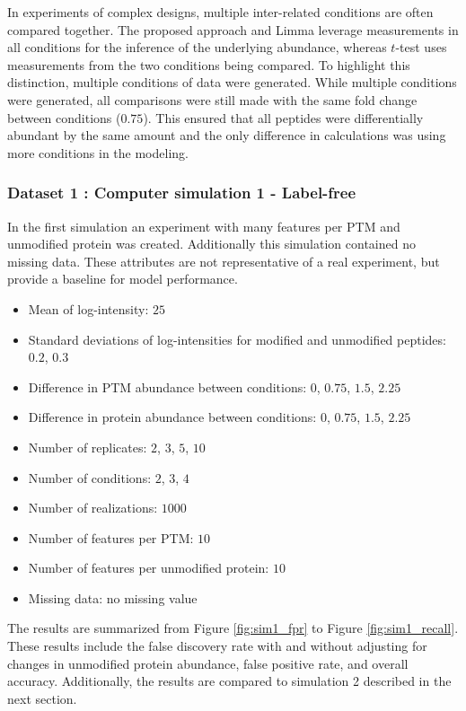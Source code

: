 \documentclass{mcp}
\begin{document}
In experiments of complex designs, multiple inter-related conditions are often compared together. The proposed approach and Limma leverage measurements in all conditions for the inference of the underlying abundance, whereas $t$-test uses measurements from the two conditions being compared. To highlight this distinction, multiple conditions of data were generated. While multiple conditions were generated, all comparisons were still made with the same fold change between conditions ($0.75$). This ensured that all peptides were differentially abundant by the same amount and the only difference in calculations was using more conditions in the modeling.

\subsubsection{Dataset 1 : Computer simulation 1 - Label-free}
\label{sec:dataset1}
In the first simulation an experiment with many features per PTM and unmodified protein was created. Additionally this simulation contained no missing data. These attributes are not representative of a real experiment, but provide a baseline for model performance.

\begin{itemize}
\item Mean of log-intensity: $25$
\item Standard deviations of log-intensities for modified and unmodified peptides: $0.2$, $0.3$
\item Difference in PTM abundance between conditions: $0$, $0.75$, $1.5$, $2.25$
\item Difference in protein abundance between conditions: $0$, $0.75$, $1.5$, $2.25$
\item Number of replicates: $2$, $3$, $5$, $10$
\item Number of conditions: $2$, $3$, $4$
\item Number of realizations: $1000$
\item Number of features per PTM: $10$
\item Number of features per unmodified protein: $10$
\item Missing data: no missing value
\end{itemize}

The results are summarized from Figure \ref{fig:sim1_fpr} to Figure \ref{fig:sim1_recall}. These results include the false discovery rate with and without adjusting for changes in unmodified protein abundance, false positive rate, and overall accuracy. Additionally, the results are compared to simulation 2 described in the next section.
\end{document}
